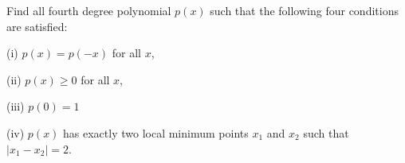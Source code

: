 Find all fourth degree polynomial $ p(x)$ such that the following four conditions are satisfied:

(i) $ p(x)=p(-x)$ for all $ x$, 

(ii) $ p(x)\ge0$ for all $ x$, 

(iii) $ p(0)=1$

(iv) $ p(x)$ has exactly two local minimum points $ x_1$ and $ x_2$ such that $ |x_1-x_2|=2$.